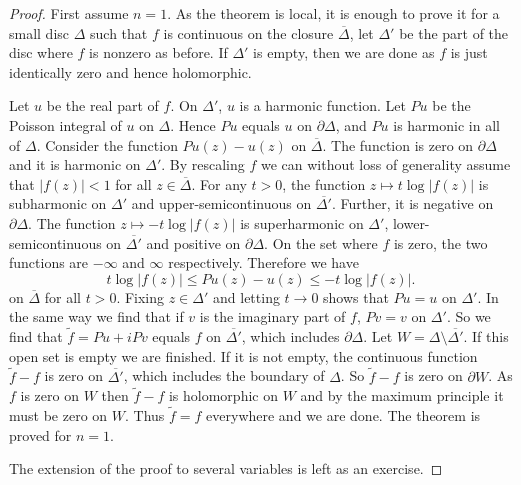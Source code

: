 \documentclass[12pt,openany]{book}
\newcommand{\abs}[1]{\left\lvert {#1} \right\rvert}
\theoremstyle{plain}
\theoremstyle{remark}
\theoremstyle{definition}
\theoremstyle{exercise}
\theoremstyle{example}
\begin{document}
\begin{proof}
First assume $n=1$.  As the theorem is local, it is
enough to prove it for a small disc $\Delta$ such that $f$ is continuous
on the closure $\overline{\Delta}$, let $\Delta'$ be the part of the disc
where $f$ is nonzero as before.  If $\Delta'$ is empty, then we are done as
$f$ is just identically zero and hence holomorphic.


Let $u$ be the real part of $f$.  On $\Delta'$, $u$ is a harmonic function.
Let $Pu$ be the Poisson integral of $u$ on $\Delta$.  Hence $Pu$
equals $u$ on $\partial \Delta$, and $Pu$ is harmonic in all of $\Delta$.
Consider the function
$Pu(z) - u(z)$ on $\overline{\Delta}$.  The function is zero
on $\partial \Delta$ and it is harmonic on $\Delta'$.  By rescaling $f$
we can without loss of generality assume that $\abs{f(z)} < 1$ for all $z
\in \overline{\Delta}$.  For any $t >0$, the function 
$z \mapsto t \log \abs{f(z)}$ is subharmonic on $\Delta'$ and
upper-semicontinuous on $\overline{\Delta'}$.  Further, it is negative
on $\partial \Delta$.  The function $z \mapsto -t \log \abs{f(z)}$ is
superharmonic on $\Delta'$,
lower-semicontinuous on $\overline{\Delta'}$ and positive on $\partial
\Delta$.  On the set where $f$ is zero, the two functions are $-\infty$ and
$\infty$ respectively.  Therefore we have
\begin{equation*}
t \log \abs{f(z)} \leq Pu(z)-u(z) \leq -t \log \abs{f(z)} .
\end{equation*}
on $\overline{\Delta}$ for all $t > 0$.  Fixing $z \in \Delta'$ and letting
$t \to 0$ shows that $Pu = u$ on $\Delta'$.  In the same way we find that if
$v$ is the imaginary part of $f$, $Pv = v$ on $\Delta'$.  So we find that
$\tilde{f} = Pu + i Pv$ equals $f$ on $\overline{\Delta'}$, which includes
$\partial \Delta$.
Let $W = \Delta \setminus \overline{\Delta'}$.  If
this open set is empty we are finished.  If it is not empty,
the continuous
function $\tilde{f}-f$ is zero on $\overline{\Delta'}$, which includes
the boundary of $\Delta$.  So $\tilde{f}-f$ is zero on $\partial W$.
As $f$ is zero on $W$ then $\tilde{f}-f$ is holomorphic on $W$ and
by the maximum principle it must be zero on $W$.  Thus
$\tilde{f} = f$ everywhere and we are done.  The theorem is proved for
$n=1$.

The extension of the proof to several variables is left as an exercise.
\end{proof}
\end{document}

